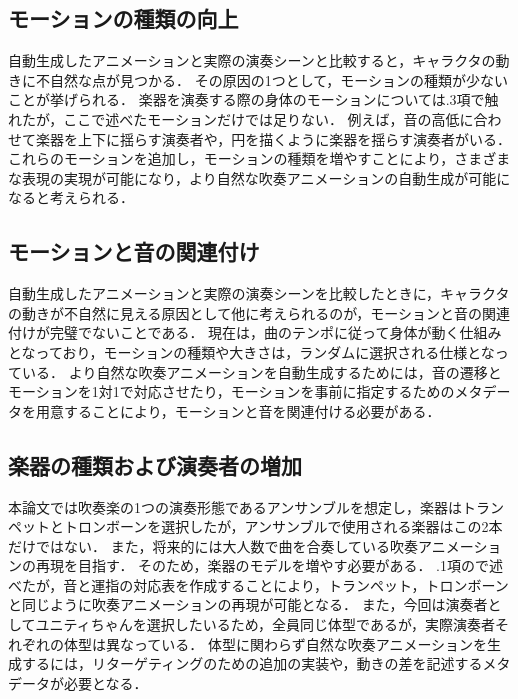 \subsection{モーションの種類の向上}
自動生成したアニメーションと実際の演奏シーンと比較すると，キャラクタの動きに不自然な点が見つかる．
その原因の1つとして，モーションの種類が少ないことが挙げられる．
楽器を演奏する際の身体のモーションについては{.3項}で触れたが，ここで述べたモーションだけでは足りない．
例えば，音の高低に合わせて楽器を上下に揺らす演奏者や，円を描くように楽器を揺らす演奏者がいる．
これらのモーションを追加し，モーションの種類を増やすことにより，さまざまな表現の実現が可能になり，より自然な吹奏アニメーションの自動生成が可能になると考えられる．

\subsection{モーションと音の関連付け}
自動生成したアニメーションと実際の演奏シーンを比較したときに，キャラクタの動きが不自然に見える原因として他に考えられるのが，モーションと音の関連付けが完璧でないことである．
現在は，曲のテンポに従って身体が動く仕組みとなっており，モーションの種類や大きさは，ランダムに選択される仕様となっている．
より自然な吹奏アニメーションを自動生成するためには，音の遷移とモーションを1対1で対応させたり，モーションを事前に指定するためのメタデータを用意することにより，モーションと音を関連付ける必要がある．

\subsection{楽器の種類および演奏者の増加}
本論文では吹奏楽の1つの演奏形態であるアンサンブルを想定し，楽器はトランペットとトロンボーンを選択したが，アンサンブルで使用される楽器はこの2本だけではない．
また，将来的には大人数で曲を合奏している吹奏アニメーションの再現を目指す．
そのため，楽器のモデルを増やす必要がある．
{.1項}ので述べたが，音と運指の対応表を作成することにより，トランペット，トロンボーンと同じように吹奏アニメーションの再現が可能となる．
また，今回は演奏者としてユニティちゃんを選択したいるため，全員同じ体型であるが，実際演奏者それぞれの体型は異なっている．
体型に関わらず自然な吹奏アニメーションを生成するには，リターゲティングのための追加の実装や，動きの差を記述するメタデータが必要となる．
